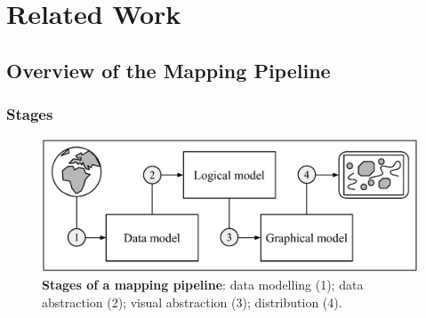 \documentclass[11pt, oneside]{report}
\begin{document}
{%


\chapter{Related Work}
\label{chapter:related:work}


\section{Overview of the Mapping Pipeline}

\subsection{Stages}


\begin{figure}[htbp]
\begin{center}
\includegraphics[scale=.5]{figs-thesis/mapping-states.pdf}
\caption{\textbf{Stages of a mapping pipeline}: data modelling (1); data abstraction (2); visual abstraction (3); distribution (4).}
\label{fig:introduction:requirements:pipeline}
\end{center}
\vspace*{-4ex}
\end{figure}

}
\end{document}
